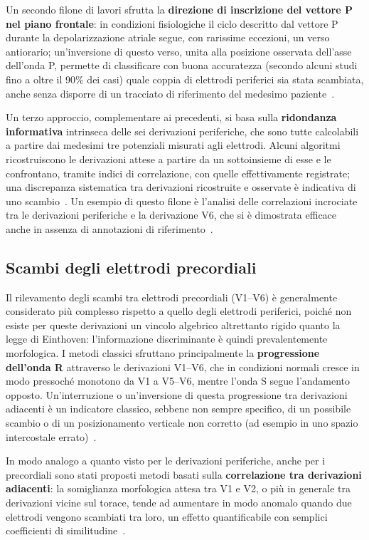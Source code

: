 Un secondo filone di lavori sfrutta la \textbf{direzione di inscrizione del vettore P nel piano frontale}: in condizioni fisiologiche il ciclo descritto dal vettore P durante la depolarizzazione atriale segue, con rarissime eccezioni, un verso antiorario; un'inversione di questo verso, unita alla posizione osservata dell'asse dell'onda P, permette di classificare con buona accuratezza (secondo alcuni studi fino a oltre il 90\% dei casi) quale coppia di elettrodi periferici sia stata scambiata, anche senza disporre di un tracciato di riferimento del medesimo paziente~\cite{ho2001pwave}.

Un terzo approccio, complementare ai precedenti, si basa sulla \textbf{ridondanza informativa} intrinseca delle sei derivazioni periferiche, che sono tutte calcolabili a partire dai medesimi tre potenziali misurati agli elettrodi. Alcuni algoritmi ricostruiscono le derivazioni attese a partire da un sottoinsieme di esse e le confrontano, tramite indici di correlazione, con quelle effettivamente registrate; una discrepanza sistematica tra derivazioni ricostruite e osservate è indicativa di uno scambio~\cite{kors2000correlation, kors2001accurate}. Un esempio di questo filone è l'analisi delle correlazioni incrociate tra le derivazioni periferiche e la derivazione V6, che si è dimostrata efficace anche in assenza di annotazioni di riferimento~\cite{jekova2016interlead}.

\subsection{Scambi degli elettrodi precordiali}

Il rilevamento degli scambi tra elettrodi precordiali (V1--V6) è generalmente considerato più complesso rispetto a quello degli elettrodi periferici, poiché non esiste per queste derivazioni un vincolo algebrico altrettanto rigido quanto la legge di Einthoven: l'informazione discriminante è quindi prevalentemente morfologica. I metodi classici sfruttano principalmente la \textbf{progressione dell'onda R} attraverso le derivazioni V1--V6, che in condizioni normali cresce in modo pressoché monotono da V1 a V5--V6, mentre l'onda S segue l'andamento opposto. Un'interruzione o un'inversione di questa progressione tra derivazioni adiacenti è un indicatore classico, sebbene non sempre specifico, di un possibile scambio o di un posizionamento verticale non corretto (ad esempio in uno spazio intercostale errato)~\cite{jekova2016interlead}.

In modo analogo a quanto visto per le derivazioni periferiche, anche per i precordiali sono stati proposti metodi basati sulla \textbf{correlazione tra derivazioni adiacenti}: la somiglianza morfologica attesa tra V1 e V2, o più in generale tra derivazioni vicine sul torace, tende ad aumentare in modo anomalo quando due elettrodi vengono scambiati tra loro, un effetto quantificabile con semplici coefficienti di similitudine~\cite{jekova2015precordial, jekova2016interlead}.

